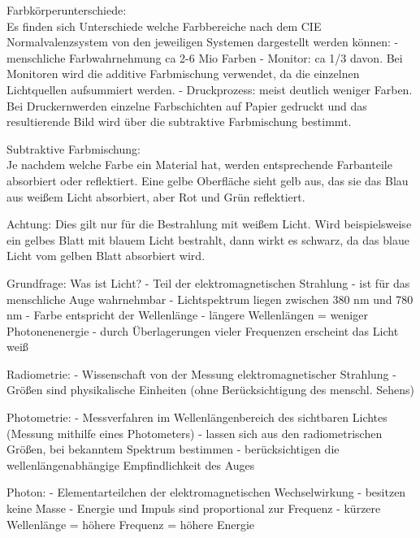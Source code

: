\documentclass[10pt,landscape]{article}
\makeatletter
\renewcommand{\section}{\@startsection{section}{1}{0mm}%
                                {-1ex plus -.5ex minus -.2ex}%
                                {0.5ex plus .2ex}%
                                {\normalfont\large\bfseries}}
\renewcommand{\subsection}{\@startsection{subsection}{2}{0mm}%
                                {-1explus -.5ex minus -.2ex}%
                                {0.5ex plus .2ex}%
                                {\normalfont\normalsize\bfseries}}
\makeatother
\begin{document}
\begin{multicols}{3}
Farbkörperunterschiede:\\
Es finden sich Unterschiede welche Farbbereiche nach dem CIE Normalvalenzsystem von den jeweiligen Systemen dargestellt werden können:
- menschliche Farbwahrnehmung ca 2-6 Mio Farben
- Monitor: ca 1/3 davon. Bei Monitoren wird die additive Farbmischung verwendet, da die einzelnen Lichtquellen aufsummiert werden.
- Druckprozess: meist deutlich weniger Farben. Bei Druckernwerden einzelne Farbschichten auf Papier gedruckt und das resultierende Bild wird über die subtraktive Farbmischung bestimmt.

Subtraktive Farbmischung:\\
Je nachdem welche Farbe ein Material hat, werden entsprechende Farbanteile absorbiert oder reflektiert. Eine gelbe Oberfläche sieht gelb aus, das sie das Blau aus weißem Licht absorbiert, aber Rot und Grün reflektiert.

Achtung: Dies gilt nur für die Bestrahlung mit weißem Licht. Wird beispielsweise ein gelbes Blatt mit blauem Licht bestrahlt, dann wirkt es schwarz, da das blaue Licht vom gelben Blatt absorbiert wird.

Grundfrage: Was ist Licht?
- Teil der elektromagnetischen Strahlung
- ist für das menschliche Auge wahrnehmbar
- Lichtspektrum liegen zwischen 380 nm und 780 nm
- Farbe entspricht der Wellenlänge
- längere Wellenlängen = weniger Photonenenergie
- durch Überlagerungen vieler Frequenzen erscheint das Licht weiß

Radiometrie:
- Wissenschaft von der Messung elektromagnetischer Strahlung
- Größen sind physikalische Einheiten (ohne Berücksichtigung des menschl. Sehens)
  
Photometrie:
- Messverfahren im Wellenlängenbereich des sichtbaren Lichtes (Messung mithilfe eines Photometers)
- lassen sich aus den radiometrischen Größen, bei bekanntem Spektrum bestimmen
- berücksichtigen die wellenlängenabhängige Empfindlichkeit des Auges

Photon:
- Elementarteilchen der elektromagnetischen Wechselwirkung
- besitzen keine Masse
- Energie und Impuls sind proportional zur Frequenz
- kürzere Wellenlänge = höhere Frequenz = höhere Energie


\end{multicols}
\end{document}
